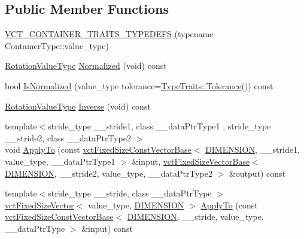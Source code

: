 \subsection*{Public Member Functions}
\begin{DoxyCompactItemize}
\item 
\hyperlink{classvct_matrix_rotation3_const_base_a8a5964653bd5a2d8e5b7577acbd973ff}{V\+C\+T\+\_\+\+C\+O\+N\+T\+A\+I\+N\+E\+R\+\_\+\+T\+R\+A\+I\+T\+S\+\_\+\+T\+Y\+P\+E\+D\+E\+F\+S} (typename Container\+Type\+::value\+\_\+type)
\item 
\hyperlink{classvct_matrix_rotation3_const_base_a913ecee79856db867ac6d45d27cfe362}{Rotation\+Value\+Type} \hyperlink{classvct_matrix_rotation3_const_base_ae3f3d95e7d9cd505300b230094b29318}{Normalized} (void) const 
\item 
bool \hyperlink{classvct_matrix_rotation3_const_base_a629632e3539b899f3b4d7d9e4f662e1c}{Is\+Normalized} (value\+\_\+type tolerance=\hyperlink{classcmn_type_traits_adc129bf9867295b90d300768b780fa99}{Type\+Traits\+::\+Tolerance}()) const 
\item 
\hyperlink{classvct_matrix_rotation3_const_base_a913ecee79856db867ac6d45d27cfe362}{Rotation\+Value\+Type} \hyperlink{classvct_matrix_rotation3_const_base_aef160dbf59345611986482d9b9e192eb}{Inverse} (void) const 
\item 
{\footnotesize template$<$stride\+\_\+type \+\_\+\+\_\+stride1, class \+\_\+\+\_\+data\+Ptr\+Type1 , stride\+\_\+type \+\_\+\+\_\+stride2, class \+\_\+\+\_\+data\+Ptr\+Type2 $>$ }\\void \hyperlink{classvct_matrix_rotation3_const_base_a832251356c47c892cfaf45846f8dd13d}{Apply\+To} (const \hyperlink{classvct_fixed_size_const_vector_base}{vct\+Fixed\+Size\+Const\+Vector\+Base}$<$ \hyperlink{classvct_matrix_rotation3_const_base_a6bc9712dde55ee3fca0d7880feb6a903afdf02f4ad230d81f0ca2539c7feb61f3}{D\+I\+M\+E\+N\+S\+I\+O\+N}, \+\_\+\+\_\+stride1, value\+\_\+type, \+\_\+\+\_\+data\+Ptr\+Type1 $>$ \&input, \hyperlink{classvct_fixed_size_vector_base}{vct\+Fixed\+Size\+Vector\+Base}$<$ \hyperlink{classvct_matrix_rotation3_const_base_a6bc9712dde55ee3fca0d7880feb6a903afdf02f4ad230d81f0ca2539c7feb61f3}{D\+I\+M\+E\+N\+S\+I\+O\+N}, \+\_\+\+\_\+stride2, value\+\_\+type, \+\_\+\+\_\+data\+Ptr\+Type2 $>$ \&output) const 
\item 
{\footnotesize template$<$stride\+\_\+type \+\_\+\+\_\+stride, class \+\_\+\+\_\+data\+Ptr\+Type $>$ }\\\hyperlink{classvct_fixed_size_vector}{vct\+Fixed\+Size\+Vector}$<$ value\+\_\+type, \hyperlink{classvct_matrix_rotation3_const_base_a6bc9712dde55ee3fca0d7880feb6a903afdf02f4ad230d81f0ca2539c7feb61f3}{D\+I\+M\+E\+N\+S\+I\+O\+N} $>$ \hyperlink{classvct_matrix_rotation3_const_base_a2e6655de4bc25d980cabef0f4ef945a5}{Apply\+To} (const \hyperlink{classvct_fixed_size_const_vector_base}{vct\+Fixed\+Size\+Const\+Vector\+Base}$<$ \hyperlink{classvct_matrix_rotation3_const_base_a6bc9712dde55ee3fca0d7880feb6a903afdf02f4ad230d81f0ca2539c7feb61f3}{D\+I\+M\+E\+N\+S\+I\+O\+N}, \+\_\+\+\_\+stride, value\+\_\+type, \+\_\+\+\_\+data\+Ptr\+Type $>$ \&input) const 

\end{DoxyCompactItemize}
